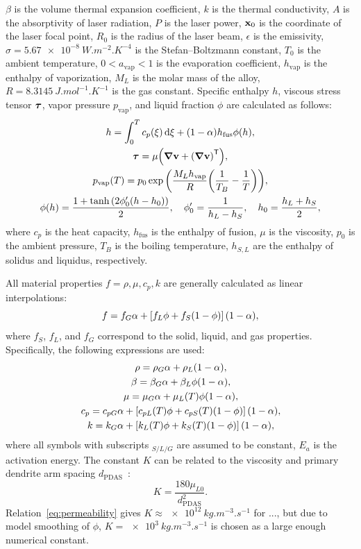 \documentclass{article}
\newcommand{\tran}{\mathsf{T}} %
\newcommand{\fusion}[1]{{#1}_\mathrm{fus}}
\newcommand{\evapor}[1]{{#1}_\mathrm{vap}}
\newcommand{\bv}{\vb{v}}
\newcommand{\bx}{\vb{x}}
\newcommand{\btau}{\vb*\tau}
\begin{document}
$\beta$ is the volume thermal expansion coefficient,
$k$ is the thermal conductivity, $A$ is the absorptivity of laser radiation, $P$ is the laser power,
$\bx_0$ is the coordinate of the laser focal point, $R_0$ is the radius of the laser beam,
$\epsilon$ is the emissivity,
$\sigma=\SI{5.67e-8}{W.m^{-2}.K^{-4}}$ is the Stefan--Boltzmann constant,
$T_0$ is the ambient temperature,
$0 < \evapor{a} < 1$ is the evaporation coefficient,
$\evapor{h}$ is the enthalpy of vaporization,
$M_L$ is the molar mass of the alloy,
$R = \SI{8.3145}{J.mol^{-1}.K^{-1}}$ is the gas constant.
Specific enthalpy $h$, viscous stress tensor $\btau$,
vapor pressure $\evapor{p}$,
and liquid fraction $\phi$ are calculated as follows:
\begin{gather}
    h = \int_0^T c_p(\xi)\dd{\xi} + (1-\alpha)\fusion{h}\phi(h), \label{eq:T}\\
    \btau = \mu\qty(\grad\bv + \qty(\grad\bv)^\tran), \label{eq:tau}\\
    \evapor{p}(T) = p_0\exp\qty(\frac{M_L\evapor{h}}{R}\qty(\frac1{T_B}-\frac1{T})), \label{eq:p_evapor}\\
    \phi(h) = \frac{1 + \tanh\qty(2\phi'_0(h-h_0))}2, \quad
        \phi'_0 = \frac1{h_L-h_S}, \quad h_0 = \frac{h_L+h_S}2, \label{eq:phi}
\end{gather}
where $c_p$ is the heat capacity,
$\fusion{h}$ is the enthalpy of fusion, $\mu$ is the viscosity, 
$p_0$ is the ambient pressure, $T_B$ is the boiling temperature,
$h_{S,L}$ are the enthalpy of solidus and liquidus, respectively.

All material properties $f = \rho, \mu, c_p, k$ are generally calculated as linear interpolations:
\begin{equation}\label{eq:properties}
    f = f_G\alpha + \qty[f_L\phi + f_S(1-\phi)](1-\alpha),
\end{equation}
where $f_S$, $f_L$, and $f_G$ correspond to the solid, liquid, and gas properties.
Specifically, the following expressions are used:
\begin{gather}
    \rho = \rho_G\alpha + \rho_L(1-\alpha), \label{eq:rho}\\
    \beta = \beta_G\alpha + \beta_L\phi(1-\alpha), \label{eq:beta}\\
    \mu = \mu_G\alpha + \mu_L(T)\phi(1-\alpha), \label{eq:mu}\\
    c_p = c_{pG}\alpha + \qty[c_{pL}(T)\phi + c_{pS}(T)(1-\phi)](1-\alpha), \label{eq:c_p}\\
    k = k_G\alpha + \qty[k_L(T)\phi + k_S(T)(1-\phi)](1-\alpha), \label{eq:k}
\end{gather}
where all symbols with subscripts ${}_{S/L/G}$ are assumed to be constant,
$E_a$ is the activation energy.
The constant $K$ can be related to the viscosity and primary dendrite arm spacing $d_\text{PDAS}$~\cite{kubo1985mathematical}:
\begin{equation}\label{eq:permeability}
    K = \frac{180\mu_{L0}}{d_\text{PDAS}^2}.
\end{equation}
Relation~\eqref{eq:permeability} gives $K \approx \SI{e12}{kg.m^{-3}.s^{-1}}$ for ...,
but due to model smoothing of $\phi$, $K = \SI{e3}{kg.m^{-3}.s^{-1}}$ is chosen as a large enough numerical constant.
\end{document}
